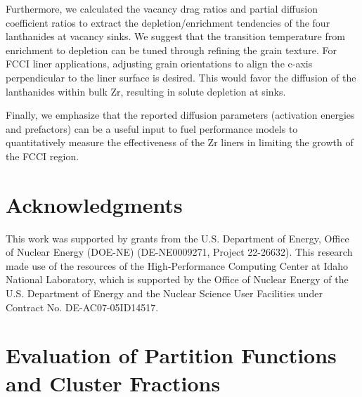 \documentclass[preprint,12pt]{elsarticle}
\providecommand{\DIFdel}[1]{} %
\providecommand{\DIFdelbegin}{\protect\color{red}} %
\providecommand{\DIFdelend}{\protect\color{black}} %
\newcommand{\DIFscaledelfig}{0.5}
\newlength{\DIFdelgraphicswidth} %
\newlength{\DIFdelgraphicsheight} %
\newcommand{\DIFdelincludegraphics}[2][]{%
\sbox{\DIFdelgraphicsbox}{\DIFOincludegraphics[#1]{#2}}%
\settoboxwidth{\DIFdelgraphicswidth}{\DIFdelgraphicsbox} %
\settoboxtotalheight{\DIFdelgraphicsheight}{\DIFdelgraphicsbox} %
\scalebox{\DIFscaledelfig}{%
\parbox[b]{\DIFdelgraphicswidth}{\usebox{\DIFdelgraphicsbox}\\[-\baselineskip] \rule{\DIFdelgraphicswidth}{0em}}\llap{\resizebox{\DIFdelgraphicswidth}{\DIFdelgraphicsheight}{%
\setlength{\unitlength}{\DIFdelgraphicswidth}%
\begin{picture}(1,1)%
\thicklines\linethickness{2pt} %
{\color[rgb]{1,0,0}\put(0,0){\framebox(1,1){}}}%
{\color[rgb]{1,0,0}\put(0,0){\line( 1,1){1}}}%
{\color[rgb]{1,0,0}\put(0,1){\line(1,-1){1}}}%
\end{picture}%
}\hspace*{3pt}}} %
} %
\DeclareRobustCommand{\DIFdelbegin}{\DIFOdelbegin \let\includegraphics\DIFdelincludegraphics} %
\DeclareRobustCommand{\DIFdelend}{\DIFOaddend \let\includegraphics\DIFOincludegraphics} %
\begin{document}
\DIFdelend Furthermore, we calculated the vacancy drag ratios and partial diffusion coefficient ratios to extract the depletion/enrichment tendencies of the four lanthanides at vacancy sinks. \DIFdelbegin \DIFdel{According to our results, we expect that in an isotropic polycrystalline Zr, the four lanthanides (La, Ce, Pr, and Nd) are always enriched at sinks at low temperatures and there is a transition to a depletion regime at high temperatures above 875 K . }\DIFdelend We suggest that the transition temperature from enrichment to depletion can be tuned through refining the grain texture. For FCCI liner applications, adjusting grain orientations to align the c-axis perpendicular to the liner surface is desired. This would favor the diffusion of the lanthanides within bulk Zr, resulting in solute depletion at sinks.

Finally, we emphasize that the reported diffusion parameters (activation energies and prefactors) can be a useful input to fuel performance models to quantitatively measure the effectiveness of the Zr liners in limiting the growth of the FCCI region. 

\FloatBarrier
\section{Acknowledgments}

This work was supported by grants from the U.S. Department of Energy, Office of Nuclear Energy (DOE-NE) (DE-NE0009271, Project 22-26632). This research made use of the resources of the High-Performance Computing Center at Idaho National Laboratory, which is supported by the Office of Nuclear Energy of the U.S. Department of Energy and the Nuclear Science User Facilities under Contract No. DE-AC07-05ID14517.

\appendix

\section{Evaluation of Partition Functions and Cluster Fractions}
\label{appendix_partition}
\end{document}
